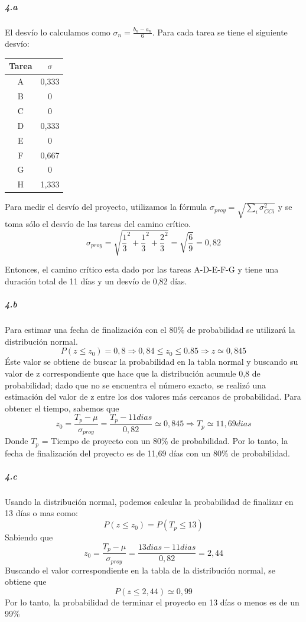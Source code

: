 \documentclass[a4paper,10pt]{article}
\begin{document}
  \subparagraph {4.a} El desvío lo calculamos como $\sigma_n = \frac{b_n - a_n}{6}$. Para cada tarea se tiene el siguiente desvío:
  \begin{center}
   \begin{tabular}{|| c | c ||}
   \hline 
      Tarea & $\sigma$ \\ \hline \hline
      A & 0,333\\ \hline
      B & 0\\ \hline
      C & 0\\ \hline
      D & 0,333\\ \hline
      E & 0\\ \hline
      F & 0,667\\ \hline
      G & 0\\ \hline
      H & 1,333\\ \hline 
      
   \end{tabular}
   \end{center}
  Para medir el desvío del proyecto, utilizamos la fórmula $ \sigma_{proy}=\sqrt{\sum _{i}^{} \sigma_{CCi}^2 }$ y se toma sólo el desvío de las tareas del camino crítico.
  $$\sigma_{proy}=\sqrt{\frac{1}{3}^2 + \frac{1}{3}^2 + \frac{2}{3}^2} = \sqrt{\frac{6}{9}} = 0,82$$
  
  Entonces, el camino crítico esta dado por las tareas A-D-E-F-G y tiene una duración total de 11 días y un desvío de 0,82 días. 
  
  \subparagraph {4.b} Para estimar una fecha de finalización con el 80\% de probabilidad se utilizará la distribución normal. 
  $$ P(z \leq z_0) = 0,8 \Rightarrow 0,84 \le z_0 \le 0.85 \Rightarrow z \simeq 0,845$$
  Éste valor se obtiene de buscar la probabilidad en la tabla normal y buscando su valor de z correspondiente que hace que la distribución acumule 0,8 de probabilidad; 
  dado que no se encuentra el número exacto, se realizó una estimación del valor de z entre los dos valores más cercanos de probabilidad. Para obtener el tiempo, sabemos que 
  $$ z_0 = \frac{T_p - \mu}{\sigma_{proy}} = \frac{T_p - 11dias}{0,82} \simeq 0,845 \Rightarrow T_p \simeq 11,69 dias $$
  Donde $T_p$ = Tiempo de proyecto con un 80\% de probabilidad.
  Por lo tanto, la fecha de finalización del proyecto es de 11,69 días con un 80\% de probabilidad.
  
  \subparagraph {4.c} Usando la distribución normal, podemos calcular la probabilidad de finalizar en 13 días o mas como:
  $$P(z \leq z_0) = P(T_p \leq 13)$$
  Sabiendo que 
  $$z_0 = \frac{T_p - \mu}{\sigma_{proy}} = \frac{13dias - 11dias}{0,82} = 2,44 $$
  Buscando el valor correspondiente en la tabla de la distribución normal, se obtiene que
  $$P(z \leq 2,44) \simeq 0,99 $$
  Por lo tanto, la probabilidad de terminar el proyecto en 13 días o menos es de un 99\%
  
\end{document}
